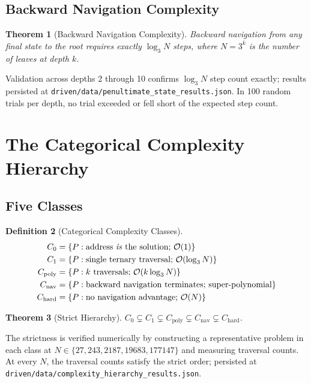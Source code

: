 \documentclass[twocolumn,11pt,a4paper]{article}
\newtheorem{theorem}{Theorem}[section]
\newtheorem{definition}[theorem]{Definition}
\begin{document}
\subsection{Backward Navigation Complexity}

\begin{theorem}[Backward Navigation Complexity]
Backward navigation from any final state to the root requires exactly $\log_3 N$ steps, where $N = 3^k$ is the number of leaves at depth $k$.
\end{theorem}

Validation across depths 2 through 10 confirms $\log_3 N$ step count exactly; results persisted at \texttt{driven/data/penultimate\_state\_results.json}. In 100 random trials per depth, no trial exceeded or fell short of the expected step count.


\section{The Categorical Complexity Hierarchy}
\label{sec:complexity_hierarchy}

\subsection{Five Classes}

\begin{definition}[Categorical Complexity Classes]
\begin{align*}
C_0           &= \{P : \text{address \emph{is} the solution; } \mathcal{O}(1)\} \\
C_1           &= \{P : \text{single ternary traversal; } \mathcal{O}(\log_3 N)\} \\
C_{\text{poly}} &= \{P : k \text{ traversals; } \mathcal{O}(k \log_3 N)\} \\
C_{\text{nav}}  &= \{P : \text{backward navigation terminates; super-polynomial}\} \\
C_{\text{hard}} &= \{P : \text{no navigation advantage; } \mathcal{O}(N)\}
\end{align*}
\end{definition}

\begin{theorem}[Strict Hierarchy]
$C_0 \subsetneq C_1 \subsetneq C_{\text{poly}} \subsetneq C_{\text{nav}} \subsetneq C_{\text{hard}}$.
\end{theorem}

The strictness is verified numerically by constructing a representative problem in each class at $N \in \{27, 243, 2187, 19683, 177147\}$ and measuring traversal counts. At every $N$, the traversal counts satisfy the strict order; persisted at \texttt{driven/data/complexity\_hierarchy\_results.json}.
\end{document}
